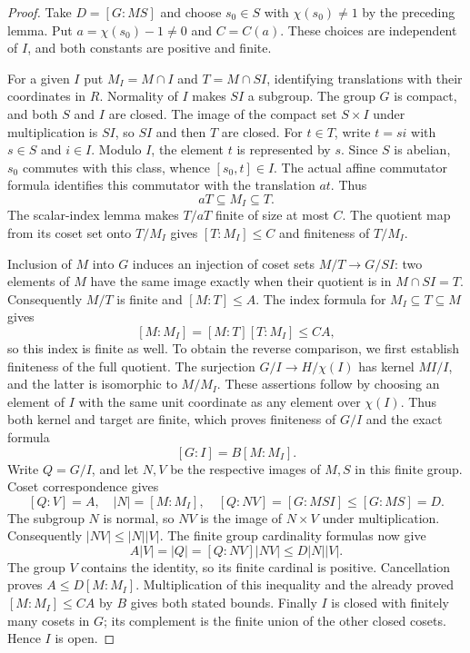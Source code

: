\begin{proof}
Take $D=[G:MS]$ and choose $s_0\in S$ with
$\chi(s_0)\ne1$ by the preceding lemma. Put
$a=\chi(s_0)-1\ne0$ and $C=C(a)$. These choices are independent
of $I$, and both constants are positive and finite.

For a given $I$ put $M_I=M\cap I$ and $T=M\cap SI$,
identifying translations with their coordinates in $R$. Normality
of $I$ makes $SI$ a subgroup. The group $G$ is compact, and both
$S$ and $I$ are closed. The image of the compact set $S\times I$
under multiplication is $SI$, so $SI$ and then $T$ are closed.
For $t\in T$, write $t=si$ with $s\in S$ and $i\in I$.
Modulo $I$, the element $t$ is represented by $s$. Since $S$ is
abelian, $s_0$ commutes with this class, whence $[s_0,t]\in I$.
The actual affine commutator formula identifies this commutator
with the translation $at$. Thus
\[
 aT\subseteq M_I\subseteq T.
\]
The scalar-index lemma makes $T/aT$ finite of size at most $C$.
The quotient map from its coset set onto $T/M_I$ gives
$[T:M_I]\leq C$ and finiteness of $T/M_I$.

Inclusion of $M$ into $G$ induces an injection of coset sets
$M/T\longrightarrow G/SI$: two elements of $M$ have the same
image exactly when their quotient is in $M\cap SI=T$.
Consequently $M/T$ is finite and $[M:T]\leq A$. The index
formula for $M_I\subseteq T\subseteq M$ gives
\[
 [M:M_I]=[M:T][T:M_I]\leq CA,
\]
so this index is finite as well. To obtain the reverse comparison,
we first establish finiteness of the full quotient. The surjection
$G/I\longrightarrow H/\chi(I)$ has kernel
$MI/I$, and the latter is isomorphic to $M/M_I$. These assertions
follow by choosing an element of $I$ with the same unit coordinate
as any element over $\chi(I)$. Thus both kernel and target are
finite, which proves finiteness of $G/I$ and the exact formula
\[
 [G:I]=B[M:M_I].
\]
Write $Q=G/I$, and let $N,V$ be the respective images of $M,S$ in
this finite group. Coset correspondence gives
\[
 [Q:V]=A,\quad |N|=[M:M_I],\quad
 [Q:NV]=[G:MSI]\leq[G:MS]=D.
\]
The subgroup $N$ is normal, so $NV$ is the image of $N\times V$
under multiplication. Consequently $|NV|\leq|N||V|$. The finite
group cardinality formulas now give
\[
 A|V|=|Q|=[Q:NV]|NV|\leq D|N||V|.
\]
The group $V$ contains the identity, so its finite cardinal is
positive. Cancellation proves $A\leq D[M:M_I]$. Multiplication
of this inequality and the already proved $[M:M_I]\leq CA$ by
$B$ gives both stated bounds. Finally $I$ is closed with finitely many cosets
in $G$; its complement is the finite union of the other closed
cosets. Hence $I$ is open.
\end{proof}

